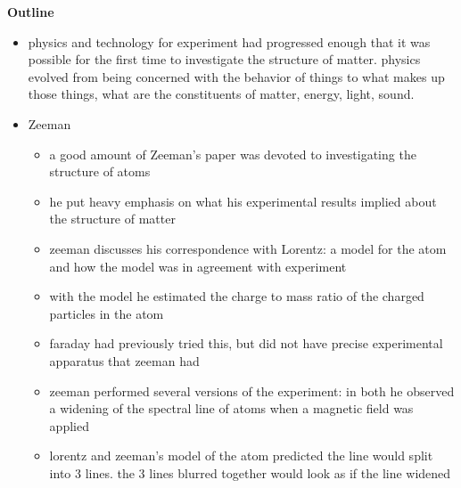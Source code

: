\documentclass[12pt, oneside, letterpaper, fleqn]{article}
\begin{document}
\begin{center}
\textbf{Outline}
\end{center}
\begin{itemize}

\item physics and technology for experiment had progressed enough that
it was possible for the first time to investigate the structure of
matter. physics evolved from being concerned with the behavior of things
to what makes up those things, what are the constituents of matter,
energy, light, sound.

\item Zeeman
\begin{itemize}
\item a good amount of Zeeman's paper was devoted to investigating the
structure of atoms
\item he put heavy emphasis on what his experimental results implied
about the structure of matter
\item zeeman discusses his correspondence with Lorentz: a model for the
atom and how the model was in agreement with experiment
\item with the model he estimated the charge to mass ratio of the
charged particles in the atom
\item faraday had previously tried this, but did not have precise
experimental apparatus that zeeman had
\item zeeman performed several versions of the experiment: in both he
observed a widening of the spectral line of atoms when a magnetic field
was applied
\item lorentz and zeeman's model of the atom predicted the line would
split into 3 lines. the 3 lines blurred together would look as if the
line widened
\end{itemize}

\end{itemize}
\end{document}
